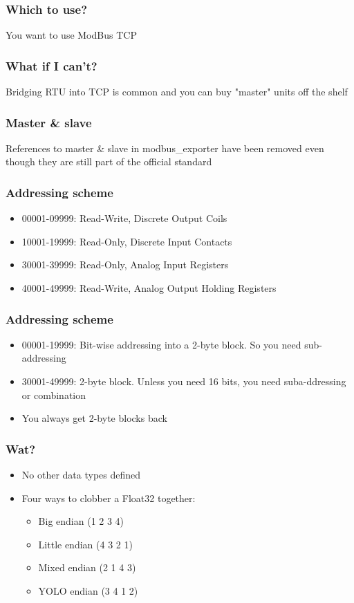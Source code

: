 \documentclass[aspectratio=169]{beamer}
\begin{document}
\begin{frame}
	\frametitle{Which to use?}
	\centering
	\vfill
	You want to use ModBus TCP
	\vfill
\end{frame}

\begin{frame}
	\frametitle{What if I can't?}
	\centering
	\vfill
	Bridging RTU into TCP is common and you can buy "master" units off the shelf
	\vfill
\end{frame}

\begin{frame}
	\frametitle{Master \& slave}
	\centering
	\vfill
	References to master \& slave in modbus\_exporter have been removed even though they are still part of the official standard
	\vfill
\end{frame}

\begin{frame}
	\frametitle{Addressing scheme}
	\begin{itemize}
		\item 00001-09999: Read-Write, Discrete Output Coils
		\item 10001-19999: Read-Only, Discrete Input Contacts
		\item 30001-39999: Read-Only, Analog Input Registers
		\item 40001-49999: Read-Write, Analog Output Holding Registers
	\end{itemize}
\end{frame}

\begin{frame}
	\frametitle{Addressing scheme}
	\begin{itemize}
		\item 00001-19999: Bit-wise addressing into a 2-byte block. So you need sub-addressing
		\item 30001-49999: 2-byte block. Unless you need 16 bits, you need suba-ddressing or combination
		\item You always get 2-byte blocks back
	\end{itemize}
\end{frame}

\begin{frame}
	\frametitle{Wat?}
	\begin{itemize}
		\item No other data types defined
		\item Four ways to clobber a Float32 together:
		\begin{itemize}
			\item Big endian (1 2 3 4)
			\item Little endian (4 3 2 1)
			\item Mixed endian (2 1 4 3)
			\item YOLO endian (3 4 1 2)
		\end{itemize}
	\end{itemize}
\end{frame}
\end{document}
